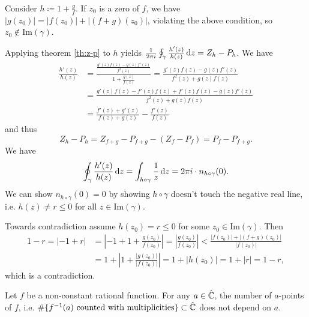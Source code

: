 \documentclass[a4paper,english]{article}
\begin{document}
\begin{pr}
    Consider $h \coloneqq 1 + \frac{g}{f}$.
    If $z_0$ is a zero of $f$, we have $| g(z_0) | = | f(z_0) | + | (f + g)(z_0) |$, violating the above condition, so $z_0 \not\in \text{Im}(\gamma)$.
    
    Applying theorem \ref{th:z-p} to $h$ yields $\frac{1}{2 \pi i} \oint_{\gamma} \frac{h'(z)}{h(z)} \mathop{}\!\mathrm{d}{z} = Z_h - P_h$.
    We have
    \begin{align*}
        \frac{h'(z)}{h(z)}
        & = \frac{\frac{g'(z) f(z) - g(z) f'(z)}{f^2(z)}}{1 + \frac{g(z)}{f(z)}}
        = \frac{g'(z) f(z) - g(z) f'(z)}{f^2(z) + g(z) f(z)} \\
        & = \frac{g'(z) f(z) - f'(z) f(z) + f'(z) f(z) - g(z) f'(z)}{f^2(z) + g(z) f(z)} \\
        & = \frac{f'(z) + g'(z)}{f(z) + g(z)} - \frac{f'(z)}{f(z)}
    \end{align*}
    and thus
    \begin{equation*}
        Z_h - P_h
        = Z_{f + g} - P_{f + g} - (Z_f - P_f)
        = P_f - P_{f + g}.
    \end{equation*}
    We have
    \begin{equation*}
        \oint_{\gamma} \frac{h'(z)}{h(z)} \mathop{}\!\mathrm{d}{z}
        = \int_{h \circ \gamma} \frac{1}{z} \mathop{}\!\mathrm{d}{z}
        = 2 \pi i \cdot n_{h \circ \gamma}(0).
    \end{equation*}
    We can show $n_{h \circ \gamma}(0) = 0$ by showing $h \circ \gamma$ doesn't touch the negative real line, i.e. $h(z) \ne r \le 0$ for all $z \in \text{Im}(\gamma)$.
    
    Towards contradiction assume $h(z_0) = r \le 0$ for some $z_0 \in \text{Im}(\gamma)$.
    Then
    \begin{align*}
        1 - r
        = | -1 + r |
        & = \left| -1 + 1 + \frac{g(z_0)}{f(z_0)} \right|
        = \left| \frac{g(z_0)}{f(z_0)} \right|
        < \frac{| f(z_0) | + | (f + g)(z_0)|}{| f(z_0) |} \\
        & = 1 + \left| 1 + \frac{| g(z_0)|}{| f(z_0) |}\right|
        = 1 + | h(z_0) |
        = 1 + | r |
        = 1 - r,
    \end{align*}
    which is a contradiction.
\end{pr}

\begin{cor}
    Let $f$ be a non-constant rational function.
    For any $a \in \hat{\operatorname{\mathbb{C}}}$, the number of $a$-points of $f$, i.e. $\#\{f^{-1}(a) \text{ counted with multiplicities} \} \subset \hat{\operatorname{\mathbb{C}}}$ does not depend on $a$.
\end{cor}
\end{document}
